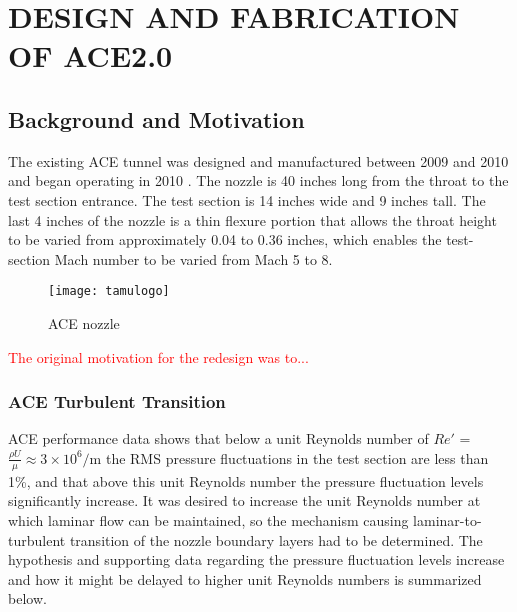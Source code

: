 %
%  
%



\chapter{DESIGN AND FABRICATION OF ACE2.0}

\section{Background and Motivation}

The existing ACE tunnel was designed and manufactured between 2009 and 2010 and began operating in 2010 \cite{ace09,ace10-calibrate,tichenor-dis}. The nozzle is 40 inches long from the throat to the test section entrance. The test section is 14 inches wide and 9 inches tall. The last 4 inches of the nozzle is a thin flexure portion that allows the throat height to be varied from approximately 0.04 to 0.36 inches, which enables the test-section Mach number to be varied from Mach 5 to 8.

\begin{figure}[ht]
    \centering
    \texttt{[image: tamulogo]}
    \caption{ACE nozzle}
    \label{fig:ace-nozzle}
\end{figure}

\textcolor{red}{The original motivation for the redesign was to...}

\subsection{ACE Turbulent Transition}

ACE performance data \cite{aceturb,mai-dis,neel-dis,leidy-dis} shows that below a unit Reynolds number of $Re'$ = $\frac{\rho U}{\mu} \approx 3 \times 10^6/\mathrm{m}$ the RMS pressure fluctuations in the test section are less than 1\%, and that above this unit Reynolds number the pressure fluctuation levels significantly increase. It was desired to increase the unit Reynolds number at which laminar flow can be maintained, so the mechanism causing laminar-to-turbulent transition of the nozzle boundary layers had to be determined. The hypothesis and supporting data regarding the pressure fluctuation levels increase and how it might be delayed to higher unit Reynolds numbers is summarized below.

